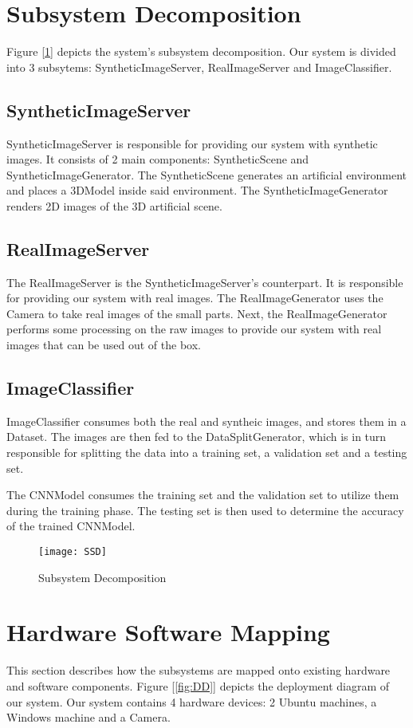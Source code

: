\section{Subsystem Decomposition}

Figure [\ref{fig:SSD}] depicts the system's subsystem decomposition. Our system is divided into 3 subsytems: SyntheticImageServer, RealImageServer and ImageClassifier.

\subsection{SyntheticImageServer}
SyntheticImageServer is responsible for providing our system with synthetic images. It consists of 2 main components: SyntheticScene and SyntheticImageGenerator. The SyntheticScene generates an artificial environment and places a 3DModel inside said environment. The SyntheticImageGenerator renders 2D images of the 3D artificial scene.

\subsection{RealImageServer}
The RealImageServer is the SyntheticImageServer's counterpart. It is responsible for providing our system with real images. The RealImageGenerator uses the Camera to take real images of the small parts. Next, the RealImageGenerator performs some processing on the raw images to provide our system with real images that can be used out of the box.

\subsection{ImageClassifier}
ImageClassifier consumes both the real and syntheic images, and stores them in a Dataset. The images are then fed to the DataSplitGenerator, which is in turn responsible for splitting the data into a training set, a validation set and a testing set.

The CNNModel consumes the training set and the validation set to utilize them during the training phase. The testing set is then used to determine the accuracy of the trained CNNModel.

\begin{figure}[H]
\centering
  \texttt{[image: SSD]}
\caption{Subsystem Decomposition}
\label{fig:SSD}
\end{figure}

\section{Hardware Software Mapping}
This section describes how the subsystems are mapped onto existing hardware and software components. Figure [\ref{fig:DD}] depicts the deployment diagram of our system. Our system contains 4 hardware devices: 2 Ubuntu machines, a Windows machine and a Camera.

